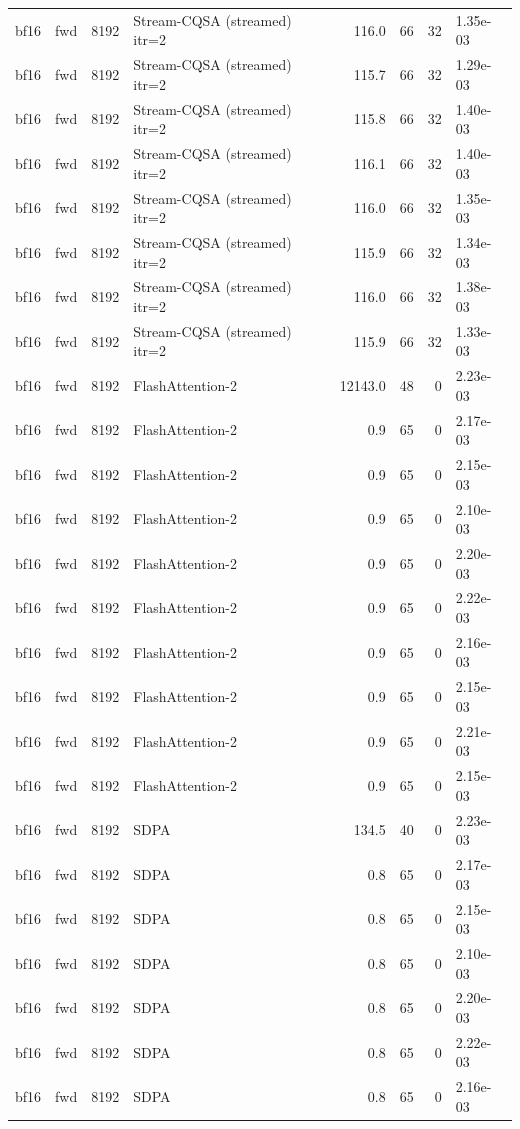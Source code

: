 \begin{tabular}{llrlrrrl}
bf16 & fwd & 8192 & Stream-CQSA (streamed) itr=2 & 116.0 & 66 & 32 & 1.35e-03 \\
bf16 & fwd & 8192 & Stream-CQSA (streamed) itr=2 & 115.7 & 66 & 32 & 1.29e-03 \\
bf16 & fwd & 8192 & Stream-CQSA (streamed) itr=2 & 115.8 & 66 & 32 & 1.40e-03 \\
bf16 & fwd & 8192 & Stream-CQSA (streamed) itr=2 & 116.1 & 66 & 32 & 1.40e-03 \\
bf16 & fwd & 8192 & Stream-CQSA (streamed) itr=2 & 116.0 & 66 & 32 & 1.35e-03 \\
bf16 & fwd & 8192 & Stream-CQSA (streamed) itr=2 & 115.9 & 66 & 32 & 1.34e-03 \\
bf16 & fwd & 8192 & Stream-CQSA (streamed) itr=2 & 116.0 & 66 & 32 & 1.38e-03 \\
bf16 & fwd & 8192 & Stream-CQSA (streamed) itr=2 & 115.9 & 66 & 32 & 1.33e-03 \\
bf16 & fwd & 8192 & FlashAttention-2 & 12143.0 & 48 & 0 & 2.23e-03 \\
bf16 & fwd & 8192 & FlashAttention-2 & 0.9 & 65 & 0 & 2.17e-03 \\
bf16 & fwd & 8192 & FlashAttention-2 & 0.9 & 65 & 0 & 2.15e-03 \\
bf16 & fwd & 8192 & FlashAttention-2 & 0.9 & 65 & 0 & 2.10e-03 \\
bf16 & fwd & 8192 & FlashAttention-2 & 0.9 & 65 & 0 & 2.20e-03 \\
bf16 & fwd & 8192 & FlashAttention-2 & 0.9 & 65 & 0 & 2.22e-03 \\
bf16 & fwd & 8192 & FlashAttention-2 & 0.9 & 65 & 0 & 2.16e-03 \\
bf16 & fwd & 8192 & FlashAttention-2 & 0.9 & 65 & 0 & 2.15e-03 \\
bf16 & fwd & 8192 & FlashAttention-2 & 0.9 & 65 & 0 & 2.21e-03 \\
bf16 & fwd & 8192 & FlashAttention-2 & 0.9 & 65 & 0 & 2.15e-03 \\
bf16 & fwd & 8192 & SDPA & 134.5 & 40 & 0 & 2.23e-03 \\
bf16 & fwd & 8192 & SDPA & 0.8 & 65 & 0 & 2.17e-03 \\
bf16 & fwd & 8192 & SDPA & 0.8 & 65 & 0 & 2.15e-03 \\
bf16 & fwd & 8192 & SDPA & 0.8 & 65 & 0 & 2.10e-03 \\
bf16 & fwd & 8192 & SDPA & 0.8 & 65 & 0 & 2.20e-03 \\
bf16 & fwd & 8192 & SDPA & 0.8 & 65 & 0 & 2.22e-03 \\
bf16 & fwd & 8192 & SDPA & 0.8 & 65 & 0 & 2.16e-03 \\

\end{tabular}
